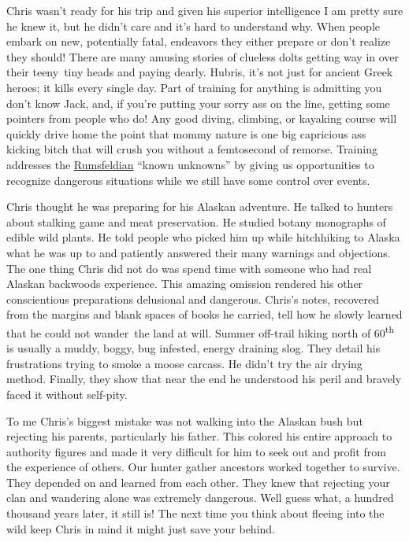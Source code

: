 Chris wasn't ready for his trip and given his superior intelligence I am
pretty sure he knew it, but he didn't care and it's hard to understand
why. When people embark on new, potentially fatal, endeavors they either
prepare or don't realize they should! There are many amusing stories of
clueless dolts getting way in over their teeny~tiny heads and paying
dearly. Hubris, it's not just for ancient Greek heroes; it kills every
single day. Part of training for anything is admitting you don't know
Jack, and, if you're putting your sorry ass on the line, getting some
pointers from people who do! Any good diving, climbing, or kayaking
course will quickly drive home the point that mommy nature is one big
capricious ass kicking bitch that will crush you without a femtosecond of
remorse. Training addresses the
\href{http://www.gruffducks.com/rumsphil.html}{Rumsfeldian} ``known
unknowns'' by giving us opportunities to recognize dangerous situations
while we still have some control over events.

Chris thought he was preparing for his Alaskan adventure. He talked to
hunters about stalking game and meat preservation. He studied botany
monographs of edible wild plants. He told people who picked him up while
hitchhiking to Alaska what he was up to and patiently answered their
many warnings and objections. The one thing Chris did not do was spend
time with someone who had real Alaskan backwoods experience. This
amazing omission rendered his other conscientious preparations
delusional and dangerous. Chris's notes, recovered from the margins and
blank spaces of books he carried, tell how he slowly learned that he
could not wander~the land at will. Summer off-trail hiking north of
60\textsuperscript{th} is usually a muddy, boggy, bug infested, energy
draining slog. They detail his frustrations trying to smoke a moose
carcass. He didn't try the air drying method. Finally, they show that
near the end he understood his peril and bravely faced it without
self-pity.

To me Chris's biggest mistake was not walking into the Alaskan bush but
rejecting his parents, particularly his father. This colored his entire
approach to authority figures and made it very difficult for him to seek
out and profit from the experience of others. Our hunter gather
ancestors worked together to survive. They depended on and learned from
each other. They knew that rejecting your clan and wandering alone was
extremely dangerous. Well guess what, a hundred thousand years later,
it still is! The next time you think about fleeing into the wild keep
Chris in mind it might just save your behind.




%